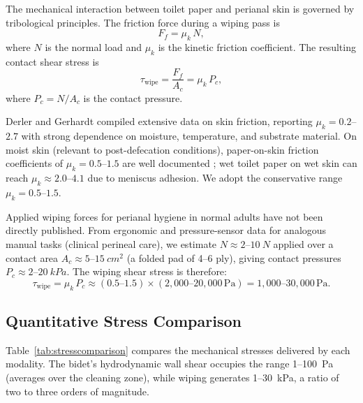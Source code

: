 \documentclass[aps,prfluids,reprint,amsmath,amssymb,floatfix]{revtex4-2}
\begin{document}
The mechanical interaction between toilet paper and perianal skin is governed
by tribological principles. The friction force during a wiping pass is
\begin{equation}
    F_f = \mu_k\,N,
    \label{eq:friction}
\end{equation}
where $N$ is the normal load and $\mu_k$ is the kinetic friction coefficient.
The resulting contact shear stress is
\begin{equation}
    \tau_\mathrm{wipe} = \frac{F_f}{A_c} = \mu_k\,P_c,
    \label{eq:contactshear}
\end{equation}
where $P_c = N/A_c$ is the contact pressure.

Derler and Gerhardt \citep{Derler2012} compiled extensive data on skin
friction, reporting $\mu_k = 0.2$--$2.7$ with strong dependence on
moisture, temperature, and substrate material. On moist skin (relevant to
post-defecation conditions), paper-on-skin friction coefficients of
$\mu_k = 0.5$--$1.5$ are well documented \citep{Vilhena2023}; wet toilet
paper on wet skin can reach $\mu_k \approx 2.0$--$4.1$ due to meniscus
adhesion. We adopt the conservative range $\mu_k = 0.5$--$1.5$.

Applied wiping forces for perianal hygiene in normal adults have not been
directly published. From ergonomic and pressure-sensor data for analogous
manual tasks (clinical perineal care), we estimate $N \approx 2$--$\SI{10}{N}$
applied over a contact area $A_c \approx 5$--$\SI{15}{cm^2}$ (a folded pad
of 4--6 ply), giving contact pressures $P_c \approx 2$--$\SI{20}{kPa}$.
The wiping shear stress is therefore:
\begin{equation}
    \tau_\mathrm{wipe} = \mu_k\,P_c \approx (0.5\text{--}1.5)
    \times (2{,}000\text{--}20{,}000\,\mathrm{Pa})
    = 1{,}000\text{--}30{,}000\,\mathrm{Pa}.
    \label{eq:wiperange}
\end{equation}

\subsection{Quantitative Stress Comparison}

Table~\ref{tab:stresscomparison} compares the mechanical stresses delivered
by each modality. The bidet's hydrodynamic wall shear occupies the range
1--\SI{100}{Pa} (averages over the cleaning zone), while wiping
generates 1--\SI{30}{kPa}, a ratio of two to three orders of
magnitude.
\end{document}
